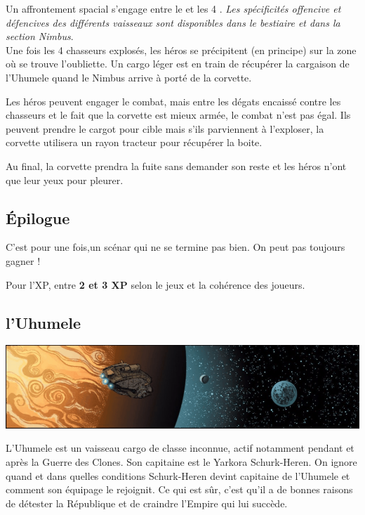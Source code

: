 Un affrontement spacial s’engage entre le  et les 4 . \textit{Les spécificités offencive et défencives des différents vaisseaux sont disponibles dans le bestiaire et dans la section Nimbus}.\\

Une fois les 4 chasseurs explosés, les héros se précipitent (en principe) sur la zone où se trouve l’oubliette. Un cargo léger est en train de récupérer la cargaison de l’Uhumele quand le Nimbus arrive à porté de la corvette.

Les héros peuvent engager le combat, mais entre les dégats encaissé contre les chasseurs et le fait que la corvette est mieux armée, le combat n’est pas égal. Ils peuvent prendre le cargot pour cible mais s’ils parviennent à l’exploser, la corvette utilisera un rayon tracteur pour récupérer la boite.

Au final, la corvette prendra la fuite sans demander son reste et les héros n’ont que leur yeux pour pleurer.

\subsection{\'Epilogue}
C’est pour une fois,un scénar qui ne se termine pas bien. On peut pas toujours gagner !

Pour l’XP, entre \textbf{2 et 3 XP} selon le jeux et la cohérence des joueurs.

\clearpage
\subsection{l’Uhumele}\label{sec:uhumele}
\noindent\includegraphics[width=\textwidth]{_img/uhumele-pano.png}

L'Uhumele est un vaisseau cargo de classe inconnue, actif notamment pendant et après la Guerre des Clones. Son capitaine est le Yarkora Schurk-Heren. On ignore quand et dans quelles conditions Schurk-Heren devint capitaine de l’Uhumele et comment son équipage le rejoignit. Ce qui est sûr, c'est qu’il a de bonnes raisons de détester la République et de craindre l’Empire qui lui succède.

